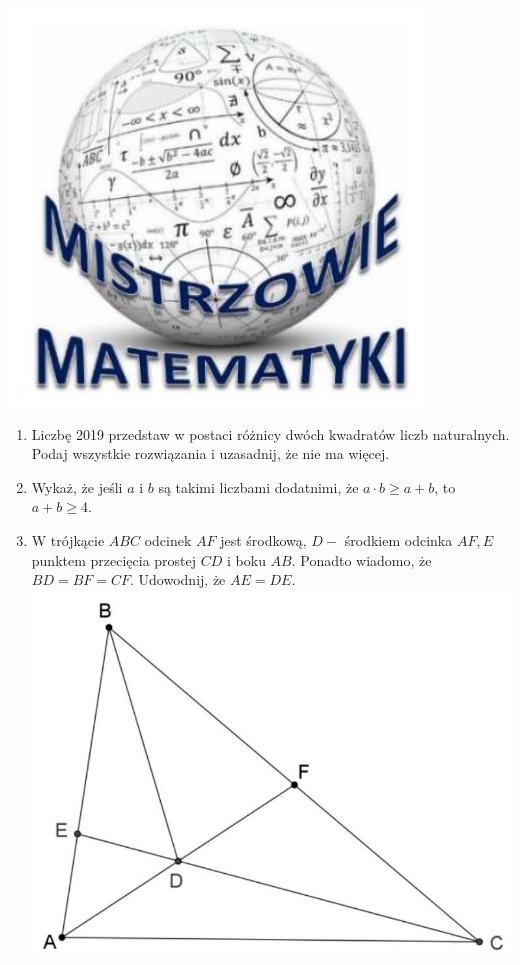 \documentclass[10pt]{article}
\begin{document}
\begin{center}
\includegraphics[max width=\textwidth]{2024_11_21_6d30b4190bf1b57758c7g-1}
\end{center}

\begin{enumerate}
  \item Liczbę 2019 przedstaw w postaci różnicy dwóch kwadratów liczb naturalnych. Podaj wszystkie rozwiązania i uzasadnij, że nie ma więcej.
  \item Wykaż, że jeśli \(a\) i \(b\) są takimi liczbami dodatnimi, że \(a \cdot b \geq a+b\), to \(a+b \geq 4\).
  \item W trójkącie \(A B C\) odcinek \(A F\) jest środkową, \(D-\) środkiem odcinka \(A F, E\) punktem przecięcia prostej \(C D\) i boku \(A B\). Ponadto wiadomo, że \(B D=B F=C F\). Udowodnij, że \(A E=D E\).\\
\includegraphics[max width=\textwidth, center]{2024_11_21_6d30b4190bf1b57758c7g-1(1)}
\end{enumerate}
\end{document}
